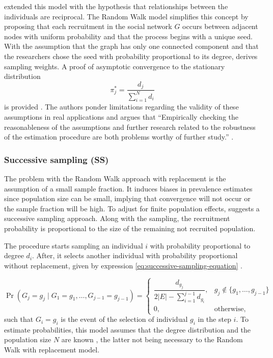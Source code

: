 \textcite[p.22]{heckathorn2002} extended this model with the hypothesis that relationships between
the individuals are reciprocal. The Random Walk model simplifies this concept
by proposing that each recruitment in the social network $G$ occurs between
adjacent nodes with uniform probability and that the process begins with a
unique seed. With the assumption that the graph has only one connected
component and that the researchers chose the seed with probability
proportional to its degree, \textcite[p. 209-218]{salganik2004sampling}
derives sampling weights. A proof of asymptotic convergence to the stationary
distribution 
\begin{equation}
  \pi_j^{*} = \frac{d_j}{\sum_{i=1}^N d_i}
\end{equation}
is provided \cite[p. 234-235]{salganik2004sampling}. The authors ponder
limitations regarding the validity of these assumptions in real applications
and argues that ``Empirically checking the reasonableness of the assumptions and further 
research related to the robustness of the estimation procedure are
both problems worthy of further study.'' \cite[p. 230]{salganik2004sampling}.

\subsubsection{Successive sampling (SS)}

The problem with the Random Walk approach with replacement is the assumption
of a small sample fraction. It induces biases in prevalence estimates since
population size can be small, implying that convergence will not occur or the
sample fraction will be high. To adjust for finite population effects,
\textcite{gile2011improved} suggests a successive sampling approach. Along
with the sampling, the recruitment probability is proportional to the size of
the remaining not recruited population.  

The procedure starts sampling an individual $i$ with probability proportional to
degree $d_i$. After, it selects another individual with probability
proportional without replacement, given by expression \eqref{eq:successive-sampling-equation} \cite[p.
136]{gile2011improved}.

\begin{equation}
  \label{eq:successive-sampling-equation}
  \Pr(G_j = g_j \mid G_1 = g_1, \dots, G_{j-1} = g_{j-1}) = \begin{cases}
    \dfrac{d_{g_j}}{2|E| - \sum_{i=1}^{j-1} d_{g_i}}, &g_j \not\in \{g_1, \dots, g_{j-1}\} \\
    0, &\text{otherwise}, 
  \end{cases}
\end{equation}
such that $G_i = g_i$ is the event of the selection of individual $g_i$ in the
step $i$. To estimate probabilities, this model assumes that the degree distribution and the
population size $N$ are known \cite[Table 2, p. 144]{gile2011improved}, the
latter not being necessary to the Random Walk with replacement model. 

